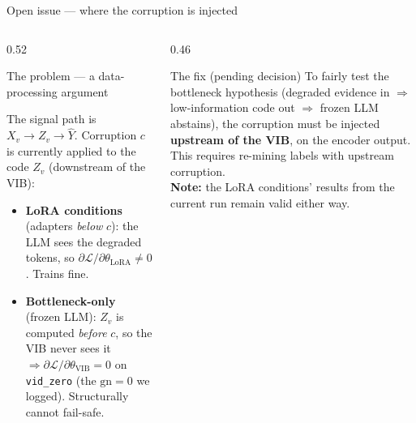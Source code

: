 \documentclass[10pt,aspectratio=169]{beamer}
\begin{document}
\begin{frame}{Open issue --- where the corruption is injected}

\begin{columns}[T]
\begin{column}{0.52\textwidth}

\begin{block}{The problem --- a data-processing argument}
{\footnotesize
The signal path is $X_v\!\to\!Z_v\!\to\!\hat Y$. Corruption $c$ is currently
applied to the code $Z_v$ (downstream of the VIB):
\begin{itemize}\setlength\itemsep{2pt}
  \item \textbf{LoRA conditions} (adapters \emph{below} $c$): the LLM sees the
        degraded tokens, so $\partial\mathcal L/\partial\theta_{\text{LoRA}}\!\neq\!0$.
        \textcolor{paperD}{Trains fine.}
  \item \textbf{Bottleneck-only} (frozen LLM): $Z_v$ is computed \emph{before}
        $c$, so the VIB never sees it $\Rightarrow
        \partial\mathcal L/\partial\theta_{\text{VIB}}\!=\!0$ on \texttt{vid\_zero}
        (the $\text{gn}\!=\!0$ we logged). \textcolor{paperA}{Structurally cannot fail-safe.}
\end{itemize}}
\end{block}

\end{column}

\begin{column}{0.46\textwidth}

\begin{block}{The fix (pending decision)}
{\footnotesize
To fairly test the bottleneck hypothesis (degraded evidence in
$\Rightarrow$ low-information code out $\Rightarrow$ frozen LLM abstains),
the corruption must be injected \textbf{upstream of the VIB}, on the encoder
output. This requires re-mining labels with upstream corruption.\\[4pt]
\textbf{Note:} the LoRA conditions' results from the current run remain valid either way.}
\end{block}

\end{column}
\end{columns}


\end{frame}
\end{document}
